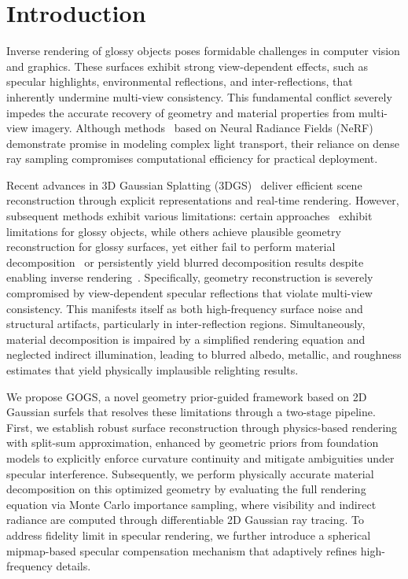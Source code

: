 \vspace{-1em}
\section{Introduction}
\label{sec:intro}
Inverse rendering of glossy objects poses formidable challenges in computer vision and graphics. These surfaces exhibit strong view-dependent effects, such as specular highlights, environmental reflections, and inter-reflections, that inherently undermine multi-view consistency. This fundamental conflict severely impedes the accurate recovery of geometry and material properties from multi-view imagery. Although methods~\cite{mildenhall2021nerf, wang2021neus, barron2021mipnerf, barron2022mipnerf360, muller2022instantngp, chen2022tensorf, verbin2022refnerf, liu2023nero, liang2023envidr, jin2023tensoir} based on Neural Radiance Fields (NeRF) demonstrate promise in modeling complex light transport, their reliance on dense ray sampling compromises computational efficiency for practical deployment.

Recent advances in 3D Gaussian Splatting (3DGS)~\cite{kerbl20233dgs} deliver efficient scene reconstruction through explicit representations and real-time rendering. However, subsequent methods exhibit various limitations: certain approaches~\cite{guedon2024sugar, yu2024mipsplatting, yu2024gof, chen2024pgsr, lu2024scaffold, huang20242dgs} exhibit limitations for glossy objects, while others achieve plausible geometry reconstruction for glossy surfaces, yet either fail to perform material decomposition~\cite{tang20243igs, yang2024specgs, bi2024gs3, zhang2025refgs} or persistently yield blurred decomposition results despite enabling inverse rendering~\cite{jiang2024gaussianshader, liang2024gsir, gao2024r3dg, ye20243dgsdr, yao2024refgaussian, gu2025irgs}.
Specifically, geometry reconstruction is severely compromised by view-dependent specular reflections that violate multi-view consistency. This manifests itself as both high-frequency surface noise and structural artifacts, particularly in inter-reflection regions. Simultaneously, material decomposition is impaired by a simplified rendering equation and neglected indirect illumination, leading to blurred albedo, metallic, and roughness estimates that yield physically implausible relighting results.

We propose GOGS, a novel geometry prior-guided framework based on 2D Gaussian surfels that resolves these limitations through a two-stage pipeline. First, we establish robust surface reconstruction through physics-based rendering with split-sum approximation, enhanced by geometric priors from foundation models to explicitly enforce curvature continuity and mitigate ambiguities under specular interference. Subsequently, we perform physically accurate material decomposition on this optimized geometry by evaluating the full rendering equation via Monte Carlo importance sampling, where visibility and indirect radiance are computed through differentiable 2D Gaussian ray tracing. To address fidelity limit in specular rendering, we further introduce a spherical mipmap-based specular compensation mechanism that adaptively refines high-frequency details.

